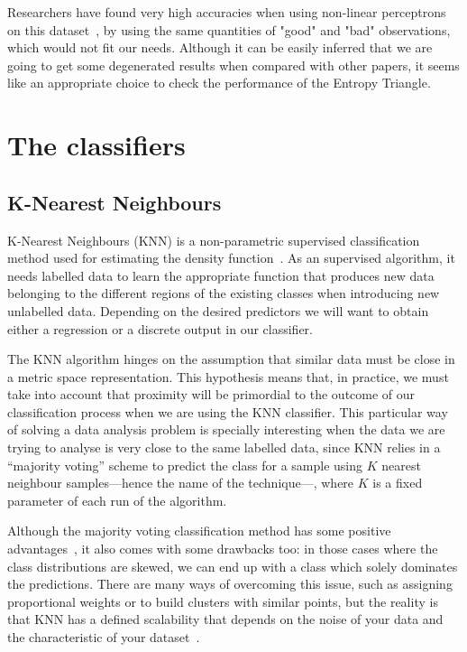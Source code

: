 Researchers have found very high accuracies when using non-linear perceptrons on this dataset~\cite{Sigillito1989ClassificationOR}, by using the same quantities of "good" and "bad" observations, which would not fit our needs. Although it can be easily inferred that we are going to get some degenerated results when compared with other papers, it seems like an appropriate choice to check the performance of the Entropy Triangle. \par 

\section{The classifiers}
\subsection{K-Nearest Neighbours}

K-Nearest Neighbours (KNN) is a non-parametric supervised classification method used for estimating the density function~\cite{mur:12}. As an supervised algorithm, it needs labelled data to learn the appropriate function that produces new data belonging to the different regions of the existing classes when introducing new unlabelled data. Depending on the desired predictors we will want to obtain either a regression or a discrete output in our classifier. 

The KNN algorithm hinges on the assumption that similar data must be close in a metric space representation. This hypothesis means that, in practice, we must take into account that proximity will be primordial to the outcome of our classification process when we are using the KNN classifier. This particular way of solving a data analysis problem is specially interesting when the data we are trying to analyse is very close to the same labelled data, since KNN relies in a ``majority voting'' scheme to predict the class for a sample using $K$ nearest neighbour samples---hence the name of the technique---, where $K$ is a fixed parameter of each run of the algorithm. 

Although the majority voting classification method has some positive advantages~\cite{article_voting_algorithms}, it also comes with some drawbacks too: in those cases where the class distributions are skewed, we can end up with a class which solely dominates the predictions. There are many ways of overcoming this issue, such as assigning proportional weights or to build clusters with similar points, but the reality is that KNN has a defined scalability that depends on the noise of your data and the characteristic of your dataset~\cite{Knn_characteristics}. \par

